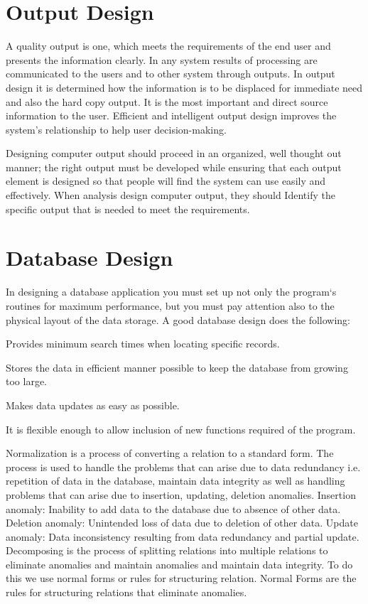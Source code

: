 \section{Output Design}

A quality output is one, which meets the requirements of the end user and presents the information clearly. In any system results of processing are communicated to the users and to other system through outputs. In output design it is determined how the information is to be displaced for immediate need and also the hard copy output. It is the most important and direct source information to the user. Efficient and intelligent output design improves the system’s relationship to help user decision-making.

Designing computer output should proceed in an organized, well thought out manner; the right output must be developed while ensuring that each output element is designed so that people will find the system can use easily and effectively. When analysis design computer output, they should Identify the specific output that is needed to meet the requirements.
%
\section{Database Design}

In designing a database application you must set up not only the program‘s routines for maximum performance, but you must pay attention also to the physical layout of the data storage. A good database design does the following:

Provides minimum search times when locating specific records.

Stores the data in efficient manner possible to keep the database from growing too large.

Makes data updates as easy as possible.

It is flexible enough to allow inclusion of new functions required of the program. 
 

 Normalization is a process of converting a relation to a standard form. The process is used to handle the problems that can arise due to data redundancy i.e. repetition of data in the database, maintain data integrity as well as handling problems that can arise due to insertion, updating, deletion anomalies. Insertion anomaly: Inability to add data to the database due to absence of other data. Deletion anomaly: Unintended loss of data due to deletion of other data. Update anomaly: Data inconsistency resulting from data redundancy and partial update. Decomposing is the process of splitting relations into multiple relations to eliminate anomalies and maintain anomalies and maintain data integrity. To do this we use normal forms or rules for structuring relation. Normal Forms are the rules for structuring relations that eliminate anomalies. 
%
%
%
%
